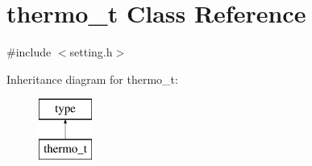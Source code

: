 \hypertarget{classthermo__t}{}\section{thermo\+\_\+t Class Reference}
\label{classthermo__t}


{\ttfamily \#include $<$setting.\+h$>$}

Inheritance diagram for thermo\+\_\+t\+:\begin{figure}[H]
\begin{center}
\leavevmode
\includegraphics[height=2.000000cm]{classthermo__t}
\end{center}
\end{figure}

